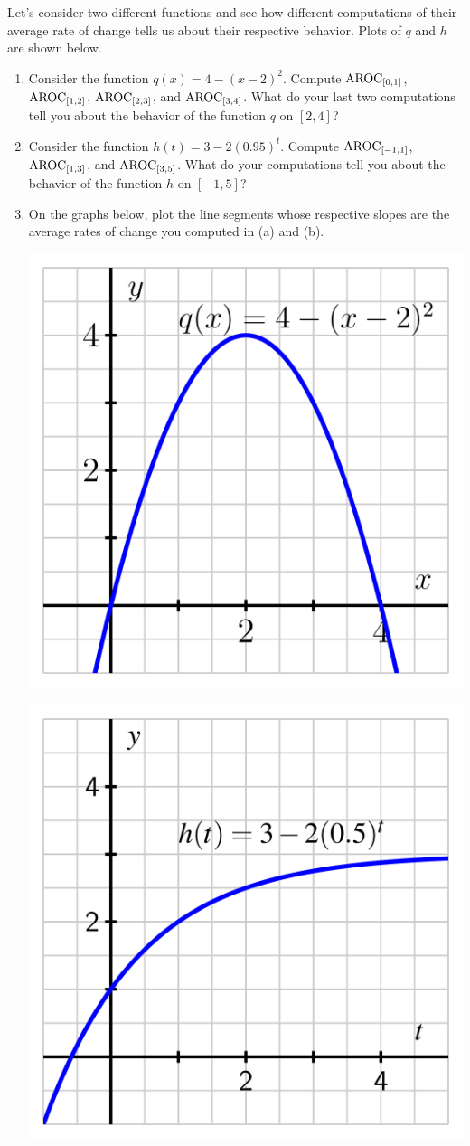 \documentclass[nooutcomes]{ximera}
\begin{document}
\begin{exploration}
Let's consider two different functions and see how different computations of their average rate of change tells us about their respective behavior. Plots of $q$  and $h$ are shown below.

\begin{enumerate}[label=\alph*.]
\item Consider the function $q(x) = 4-(x-2)^2$. Compute $\mathrm{AROC}_{[0,1]}$, $\mathrm{AROC}_{[1,2]}$, $\mathrm{AROC}_{[2,3]}$, and $\mathrm{AROC}_{[3,4]}$. What do your last two computations tell you about the behavior of the function $q$ on $[2,4]$?


\item Consider the function $h(t) = 3 - 2(0.95)^t$. Compute $\mathrm{AROC}_{[-1,1]}$, $\mathrm{AROC}_{[1,3]}$, and $\mathrm{AROC}_{[3,5]}$. What do your computations tell you about the behavior of the function $h$ on $[-1,5]$?

\item On the graphs below, plot the line segments whose respective slopes are the average rates of change you computed in (a) and (b).

\begin{image}
\includegraphics[width=.7\textwidth]{aroc-act-trends-q.jpg}
\end{image}

\begin{image}
\includegraphics[width=.7\textwidth]{aroc-act-trends-h.jpg}
\end{image}


\end{enumerate}
\end{exploration}
\end{document}
